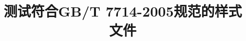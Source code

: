 \documentclass[adobefonts]{ctexart}
\begin{document}
\title{测试符合GB/T 7714-2005规范的{\BibTeX}样式文件}


\nocite{*}

\end{document}
